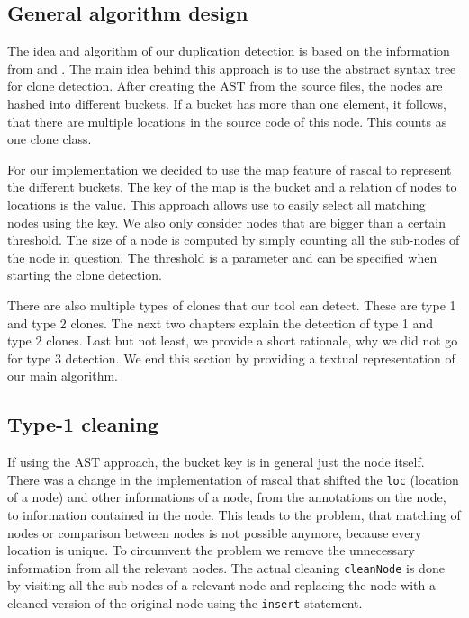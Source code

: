 \documentclass{uva-inf-article}
\begin{document}
\subsection{General algorithm design}

The idea and algorithm of our duplication detection is based on the
information from \cite{lazar2014clone} and \cite{baxter1998clone}. 
The main idea behind this approach is to use the abstract syntax tree for clone detection.
After creating the AST from the source files, the nodes are hashed into different buckets.
If a bucket has more than one element, it follows, that there are multiple locations in the source code of this node.
This counts as one clone class. 

For our implementation we decided to use the map feature of rascal to represent the different buckets. The key of the map is the bucket and a relation of nodes to locations is the value. This approach allows use to easily select all matching nodes using the key.  We also only consider nodes that are bigger than a certain threshold. The size of a node is computed by simply counting all the sub-nodes of the node in question. The threshold is a parameter and can be specified when starting the clone detection.

There are also multiple types of clones that our tool can detect. These are type 1 and type 2 clones. The next two chapters explain the detection of type 1 and type 2 clones. Last but not least, we provide a short rationale, why we did not go for type 3 detection. We end this section by providing a textual representation of our main algorithm.

\subsection{Type-1 cleaning}

If using the AST approach, the bucket key is in general just the node itself. There was a change in the implementation of rascal that shifted the \texttt{loc} (location of a node) and other informations of a node, from the annotations on the node, to information contained in the node. This leads to the problem, that matching of nodes or comparison between nodes is not possible anymore, because every location is unique. To circumvent the problem we remove the unnecessary information from all the relevant nodes. The actual cleaning \texttt{cleanNode} is done by visiting all the sub-nodes of a relevant node and replacing the node with a cleaned version of the original node using the \texttt{insert} statement.
\end{document}
